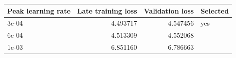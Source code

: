 \begin{tabular}{lrrl}
\toprule
Peak learning rate & Late training loss & Validation loss & Selected \\
\midrule
3e-04 & 4.493717 & 4.547456 & yes \\
6e-04 & 4.513309 & 4.552068 &  \\
1e-03 & 6.851160 & 6.786663 &  \\
\bottomrule
\end{tabular}
